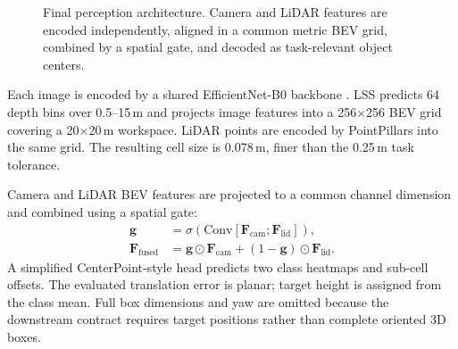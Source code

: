 \documentclass[conference]{IEEEtran}
\begin{document}
\begin{figure}[t]
{%
}
\caption{Final perception architecture. Camera and LiDAR features are encoded independently, aligned in a common metric BEV grid, combined by a spatial gate, and decoded as task-relevant object centers.}
\label{fig:architecture}
\end{figure}

Each image is encoded by a shared EfficientNet-B0 backbone \cite{tan2019efficientnet}. LSS predicts 64 depth bins over 0.5--15\,m and projects image features into a 256$\times$256 BEV grid covering a 20$\times$20\,m workspace. LiDAR points are encoded by PointPillars into the same grid. The resulting cell size is 0.078\,m, finer than the 0.25\,m task tolerance.

Camera and LiDAR BEV features are projected to a common channel dimension and combined using a spatial gate:
\begin{align}
    \mathbf{g} &=
    \sigma\!\left(\mathrm{Conv}\left[
    \mathbf{F}_{\mathrm{cam}};\mathbf{F}_{\mathrm{lid}}
    \right]\right),\\
    \mathbf{F}_{\mathrm{fused}} &=
    \mathbf{g}\odot\mathbf{F}_{\mathrm{cam}}
    +(1-\mathbf{g})\odot\mathbf{F}_{\mathrm{lid}}.
\end{align}
A simplified CenterPoint-style head predicts two class heatmaps and sub-cell offsets. The evaluated translation error is planar; target height is assigned from the class mean. Full box dimensions and yaw are omitted because the downstream contract requires target positions rather than complete oriented 3D boxes.
\end{document}
